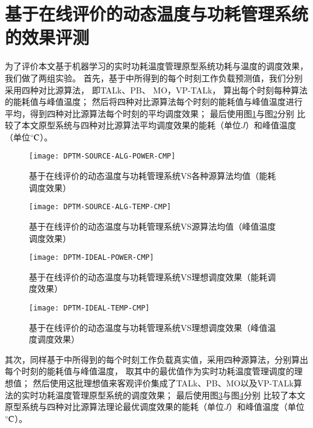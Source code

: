 \section{基于在线评价的动态温度与功耗管理系统的效果评测}
为了评价本文基于机器学习的实时功耗温度管理原型系统功耗与温度的调度效果，我们做了两组实验。
首先，基于中所得到的每个时刻工作负载预测值，我们分别采用四种对比源算法， 即TALk、PB、 MO，VP-TALk， 算出每个时刻每种算法的能耗值与峰值温度； 然后将四种对比源算法每个时刻的能耗值与峰值温度进行平均，得到四种对比源算法每个时刻的平均调度效果； 最后使用图\ref{fig:dptm-source-alg-power-cmp}与图\ref{fig:dptm-source-alg-temp-cmp}分别 比较了本文原型系统与四种对比源算法平均调度效果的能耗（单位$J$）和峰值温度（单位$\celsius$）。
\begin{figure}[H]
  \centering
  \texttt{[image: DPTM-SOURCE-ALG-POWER-CMP]}
  \caption{基于在线评价的动态温度与功耗管理系统VS各种源算法均值（能耗调度效果）}
  \label{fig:dptm-source-alg-power-cmp}
\end{figure}
\begin{figure}[H]
  \centering
  \texttt{[image: DPTM-SOURCE-ALG-TEMP-CMP]}
  \caption{基于在线评价的动态温度与功耗管理系统VS源算法均值（峰值温度调度效果）}
  \label{fig:dptm-source-alg-temp-cmp}
\end{figure}
\begin{figure}[H]
  \centering
  \texttt{[image: DPTM-IDEAL-POWER-CMP]}
  \caption{基于在线评价的动态温度与功耗管理系统VS理想调度效果（能耗调度效果）}
  \label{fig:dptm-ideal-power-cmp}
\end{figure}
\begin{figure}[H]
  \centering
  \texttt{[image: DPTM-IDEAL-TEMP-CMP]}
  \caption{基于在线评价的动态温度与功耗管理系统VS理想调度效果（峰值温度调度效果）}
  \label{fig:dptm-ideal-temp-cmp}
\end{figure}

其次，同样基于中所得到的每个时刻工作负载真实值，采用四种源算法，分别算出每个时刻的能耗值与峰值温度， 取其中的最优值作为实时功耗温度管理调度的理想值； 然后使用这批理想值来客观评价集成了TALk、PB、MO以及VP-TALk算法的实时功耗温度管理原型系统的调度效果； 最后使用图\ref{fig:dptm-ideal-power-cmp}与图\ref{fig:dptm-ideal-temp-cmp}分别 比较了本文原型系统与四种对比源算法理论最优调度效果的能耗（单位$J$）和峰值温度（单位$\celsius$）。

